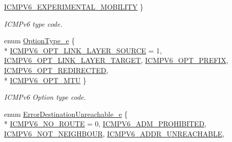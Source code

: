 \begin{DoxyCompactItemize}
\hyperlink{classns3_1_1Icmpv6Header_ad13fcbee075bf00f66ffbc57dfbecb70a0a8914db4d8f468ac0ba4ed50960f519}{I\+C\+M\+P\+V6\+\_\+\+E\+X\+P\+E\+R\+I\+M\+E\+N\+T\+A\+L\+\_\+\+M\+O\+B\+I\+L\+I\+TY}
 \}\begin{DoxyCompactList}\small\item\em I\+C\+M\+Pv6 type code. \end{DoxyCompactList}
\item 
enum \hyperlink{classns3_1_1Icmpv6Header_a1992e0e28c453f5e23b1ad55a49b7908}{Option\+Type\+\_\+e} \{ \\*
\hyperlink{classns3_1_1Icmpv6Header_a1992e0e28c453f5e23b1ad55a49b7908a07035de174ae9be5f6818c46eb299c48}{I\+C\+M\+P\+V6\+\_\+\+O\+P\+T\+\_\+\+L\+I\+N\+K\+\_\+\+L\+A\+Y\+E\+R\+\_\+\+S\+O\+U\+R\+CE} = 1, 
\hyperlink{classns3_1_1Icmpv6Header_a1992e0e28c453f5e23b1ad55a49b7908a9a014e199d5c5492a04523cf04938b26}{I\+C\+M\+P\+V6\+\_\+\+O\+P\+T\+\_\+\+L\+I\+N\+K\+\_\+\+L\+A\+Y\+E\+R\+\_\+\+T\+A\+R\+G\+ET}, 
\hyperlink{classns3_1_1Icmpv6Header_a1992e0e28c453f5e23b1ad55a49b7908ad2ca2001cf55fb44a575a7dc992e0e2e}{I\+C\+M\+P\+V6\+\_\+\+O\+P\+T\+\_\+\+P\+R\+E\+F\+IX}, 
\hyperlink{classns3_1_1Icmpv6Header_a1992e0e28c453f5e23b1ad55a49b7908afd0893e626863e709d20e5d8398d9eef}{I\+C\+M\+P\+V6\+\_\+\+O\+P\+T\+\_\+\+R\+E\+D\+I\+R\+E\+C\+T\+ED}, 
\\*
\hyperlink{classns3_1_1Icmpv6Header_a1992e0e28c453f5e23b1ad55a49b7908a01736885b7e667e2ec3b76f9bae8b0cb}{I\+C\+M\+P\+V6\+\_\+\+O\+P\+T\+\_\+\+M\+TU}
 \}\begin{DoxyCompactList}\small\item\em I\+C\+M\+Pv6 Option type code. \end{DoxyCompactList}
\item 
enum \hyperlink{classns3_1_1Icmpv6Header_a2609b9581c3de3d6bbf8d55f5adf0d1d}{Error\+Destination\+Unreachable\+\_\+e} \{ \\*
\hyperlink{classns3_1_1Icmpv6Header_a2609b9581c3de3d6bbf8d55f5adf0d1da87eecfb727188f14485806388ca7839a}{I\+C\+M\+P\+V6\+\_\+\+N\+O\+\_\+\+R\+O\+U\+TE} = 0, 
\hyperlink{classns3_1_1Icmpv6Header_a2609b9581c3de3d6bbf8d55f5adf0d1da6942af663b31edaddae4885ef3149135}{I\+C\+M\+P\+V6\+\_\+\+A\+D\+M\+\_\+\+P\+R\+O\+H\+I\+B\+I\+T\+ED}, 
\hyperlink{classns3_1_1Icmpv6Header_a2609b9581c3de3d6bbf8d55f5adf0d1da721a9422545fc443e598f9f4cfda378a}{I\+C\+M\+P\+V6\+\_\+\+N\+O\+T\+\_\+\+N\+E\+I\+G\+H\+B\+O\+UR}, 
\hyperlink{classns3_1_1Icmpv6Header_a2609b9581c3de3d6bbf8d55f5adf0d1dae3beba5685922da42d2025be8f62f90d}{I\+C\+M\+P\+V6\+\_\+\+A\+D\+D\+R\+\_\+\+U\+N\+R\+E\+A\+C\+H\+A\+B\+LE}, 

\end{DoxyCompactItemize}
